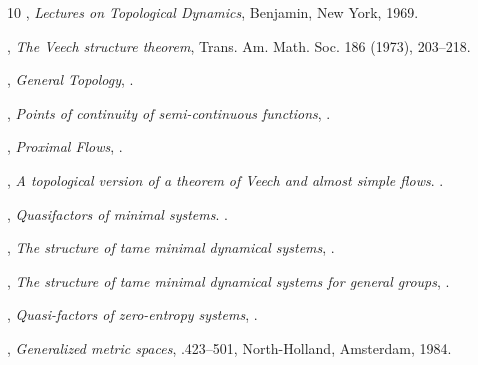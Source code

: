 \documentclass[12pt,final,3p,times]{elsarticle}
\theoremstyle{definition}
\numberwithin{equation}{section}
\begin{document}
\begin{thebibliography}{10}
,
\newblock \emph{Lectures on Topological Dynamics},
\newblock Benjamin, New York, 1969.

,
\newblock \emph{The Veech structure theorem},
\newblock Trans. Am. Math. Soc. 186 (1973), 203--218.

,
\newblock \emph{General Topology},
.


,
\newblock \emph{Points of continuity of semi-continuous functions},
.


,
\newblock \emph{Proximal Flows},
.

   ,
   \newblock \emph{A topological version of a theorem of Veech and almost simple flows}.
   .

   ,
   \newblock \emph{Quasifactors of minimal systems}.
   .

,
\newblock \emph{The structure of tame minimal dynamical systems},
.

,
\newblock \emph{The structure of tame minimal dynamical systems for general groups},
.

,
\newblock \emph{Quasi-factors of zero-entropy systems},
.


,
\newblock \emph{Generalized metric spaces},
.423--501, North-Holland, Amsterdam, 1984.


\end{thebibliography}
\end{document}
